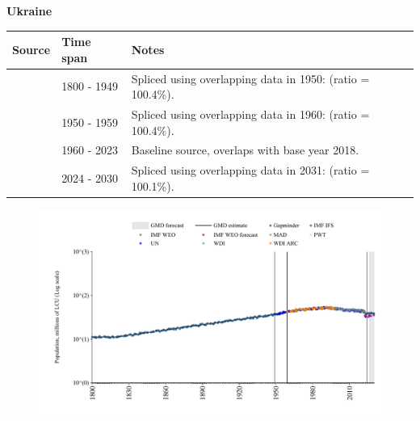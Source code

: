 \documentclass[12pt,a4paper,landscape]{article}
\begin{document}
\begin{adjustbox}{max totalsize={\paperwidth}{\paperheight},center}
\begin{minipage}[t][\textheight][t]{\textwidth}
\vspace*{0.5cm}
{}
\begin{center}
{\Large\bfseries Ukraine}
\end{center}
\vspace{0.5cm}
\begin{table}[H]
\centering
\small
\begin{tabular}{|l|l|l|}
\hline
\textbf{Source} & \textbf{Time span} & \textbf{Notes} \\
\hline
\rowcolor{white}\cite{Gapminder}& 1800 - 1949 &Spliced using overlapping data in 1950: (ratio = 100.4\%).\\
\rowcolor{lightgray}\cite{IMF_IFS}& 1950 - 1959 &Spliced using overlapping data in 1960: (ratio = 100.4\%).\\
\rowcolor{white}\cite{WDI}& 1960 - 2023 &Baseline source, overlaps with base year 2018.\\
\rowcolor{lightgray}\cite{Gapminder}& 2024 - 2030 &Spliced using overlapping data in 2031: (ratio = 100.1\%).\\
\hline
\end{tabular}
\end{table}
\begin{figure}[H]
\centering
\includegraphics[width=\textwidth,height=0.6\textheight,keepaspectratio]{graphs/UKR_pop.pdf}
\end{figure}
\end{minipage}
\end{adjustbox}
\end{document}
